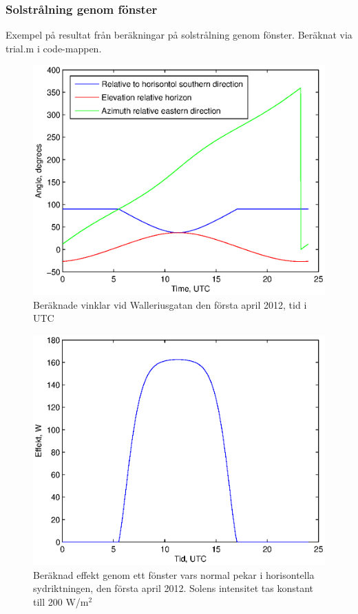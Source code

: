 ﻿\subsubsection{Solstrålning genom fönster}

Exempel på resultat från beräkningar på solstrålning genom fönster. Beräknat via trial.m i code-mappen.

\begin{figure}[hpbt]
\centering
\includegraphics[scale=1]{images/angles120401.eps}
\caption{\label{fig:vinklar120401} Beräknade vinklar vid Walleriusgatan den första april 2012, tid i UTC}
\end{figure}

\begin{figure}[hpbt]
\centering
\includegraphics[scale=1]{images/effekt120401.eps}
\caption{\label{fig:effekt120401} Beräknad effekt genom ett fönster vars normal pekar i horisontella sydriktningen, den första april 2012. Solens intensitet tas konstant till 200 W/m$^2$}
\end{figure}
